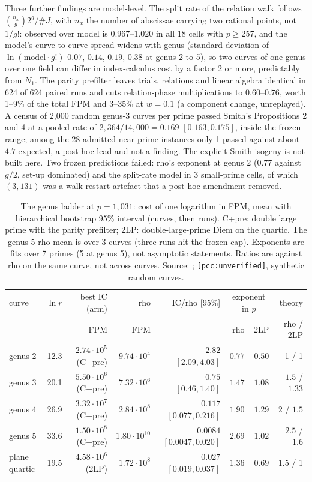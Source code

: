Three further findings are model-level. The split rate of the relation
walk follows $\binom{n_x}{g}2^g/\#J$, with $n_x$ the number of abscissae
carrying two rational points, not $1/g!$: observed over model is
$0.967$--$1.020$ in all 18 cells with $p\ge257$, and the model's
curve-to-curve spread widens with genus (standard deviation of
$\ln(\text{model}\cdot g!)$ $0.07$, $0.14$, $0.19$, $0.38$ at genus 2 to 5), so
two curves of one genus over one field can differ in index-calculus cost by
a factor 2 or more, predictably from $N_1$. The parity prefilter leaves
trials, relations and linear algebra identical in 624 of 624 paired runs
and cuts relation-phase multiplications to $0.60$--$0.76$, worth 1--9\% of
the total FPM and 3--35\% at $w=0.1$ (a component change, unreplayed). A
census of 2{,}000 random genus-3 curves per prime passed Smith's
Propositions 2 and 4 at a pooled rate of $2{,}364/14{,}000=0.169$
$[0.163,0.175]$, inside the frozen range; among the 28 admitted near-prime
instances only 1 passed against about $4.7$ expected, a post hoc lead and
not a finding. The explicit Smith isogeny is not built here. Two frozen
predictions failed: rho's exponent at genus 2 ($0.77$ against $g/2$, set-up
dominated) and the split-rate model in 3 small-prime cells, of which
$(3,131)$ was a walk-restart artefact that a post hoc amendment removed.

\begin{table}[t]
\centering\footnotesize
\begin{tabular}{@{}lrrrrrrr@{}}
\toprule
curve & $\ln r$ & best IC (arm) & rho & IC/rho [95\%] & \multicolumn{2}{c}{exponent in $p$} & theory \\
 & & FPM & FPM & & rho & 2LP & rho / 2LP \\
\midrule
genus 2 & 12.3 & $2.74\cdot10^5$ (C+pre) & $9.74\cdot10^4$ & $2.82$ $[2.09,4.03]$ & $0.77$ & $0.50$ & 1 / 1 \\
genus 3 & 20.1 & $5.50\cdot10^6$ (C+pre) & $7.32\cdot10^6$ & $0.75$ $[0.46,1.40]$ & $1.47$ & $1.08$ & $1.5$ / $1.33$ \\
genus 4 & 26.9 & $3.32\cdot10^7$ (C+pre) & $2.84\cdot10^8$ & $0.117$ $[0.077,0.216]$ & $1.90$ & $1.29$ & 2 / $1.5$ \\
genus 5 & 33.6 & $1.50\cdot10^8$ (C+pre) & $1.80\cdot10^{10}$ & $0.0084$ $[0.0047,0.020]$ & $2.69$ & $1.02$ & $2.5$ / $1.6$ \\
plane quartic & 19.5 & $4.58\cdot10^6$ (2LP) & $1.72\cdot10^8$ & $0.027$ $[0.019,0.037]$ & $1.36$ & $0.69$ & $1.5$ / 1 \\
\bottomrule
\end{tabular}
\caption[]{The genus ladder at $p=1{,}031$: cost of one logarithm in FPM,
mean with hierarchical bootstrap 95\% interval (curves, then runs). C+pre:
double large prime with the parity prefilter; 2LP: double-large-prime Diem
on the quartic. The genus-5 rho mean is over 3 curves (three runs hit the
frozen cap). Exponents are fits over 7 primes (5 at genus 5), not asymptotic
statements. Ratios are against rho on the same curve, not across curves.
Source: ;
\texttt{[pcc:unverified]}, synthetic random curves.}
\label{tab:jac-ladder}
\end{table}

